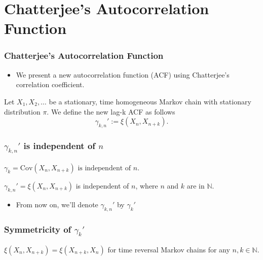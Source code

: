 \documentclass [xcolor=svgnames, t] {beamer}
\begin{document}
\section{Chatterjee's Autocorrelation Function}
\begin{frame}
    \frametitle{Chatterjee's Autocorrelation Function}
    \begin{itemize}
        \item We present a new autocorrelation function (ACF) using Chatterjee's correlation coefficient.
    \end{itemize}
    \vspace{2em}
    \begin{definition}
        Let $X_1, X_2, \dots$ be a stationary, time homogeneous Markov chain with stationary distribution $\pi$.
        We define the new lag-k ACF as follows
        $$\gamma_{k, n}' := \xi(X_n, X_{n+k}).$$
    \end{definition}

\end{frame}

\begin{frame}
    \frametitle{$\gamma_{k, n}'$ is independent of $n$}
    \vspace{1em}
    \begin{theorem}
        $\gamma_k = \text{Cov}(X_n, X_{n+k}) \text{ is independent of } n.$
    \end{theorem}
    \vspace{2em}
    \begin{theorem}
        $\gamma_{k, n}' = \xi(X_n, X_{n+k})$ is independent of $n$, where $n$ and $k$ are in $\mathbb{N}$.
    \end{theorem}
    \vspace{2em}
    \begin{itemize}
        \item From now on, we'll denote $\gamma_{k, n}'$ by $\gamma_{k}'$
    \end{itemize}
\end{frame}

\begin{frame}
    \frametitle{Symmetricity of $\gamma_k'$}
    \vspace{5.5em}
    \begin{theorem}
        $\xi(X_n, X_{n+k}) = \xi(X_{n+k}, X_n)$ for time reversal Markov chains for any $n, k \in \mathbb{N}$.
    \end{theorem}

\end{frame}
\end{document}
